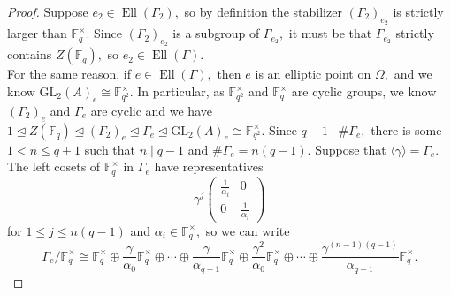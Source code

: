 \documentclass[11pt]{amsart}
\theoremstyle{definition}
\numberwithin{equation}{section}
\newcommand{\GL}{\mathrm{GL}} 	%
\newcommand{\bbF}{\mathbb{F}}		%
\begin{document}
		\begin{proof}
			Suppose $e_2\in \operatorname{Ell}(\Gamma_2),$ so by definition the stabilizer $(\Gamma_2)_{e_2}$ is strictly larger than $\bbF_q^{\times}.$ Since $(\Gamma_2)_{e_2}$ is a subgroup of $\Gamma_{e_2},$ it must be that $\Gamma_{e_2}$ strictly contains $Z(\bbF_q),$ so $e_2\in \operatorname{Ell}(\Gamma).$\\
			
			For the same reason, if $e\in \operatorname{Ell}(\Gamma),$ then $e$ is an elliptic point on $\Omega,$ and we know $\GL_2(A)_e\cong \bbF_{q^2}^{\times}.$  In particular, as $\bbF_{q^2}^{\times}$ and $\bbF_q^{\times}$ are cyclic groups, we know $(\Gamma_2)_e$ and $\Gamma_e$ are cyclic and we have $1\unlhd Z(\bbF_q)\unlhd (\Gamma_2)_e\unlhd \Gamma_e\unlhd \GL_2(A)_e\cong \bbF_{q^2}^{\times}.$ 
			Since $q-1\mid \#\Gamma_e,$ there is some $1<n\leq q+1$ such that $n\mid q-1$ and $\#\Gamma_e=n(q-1).$ 
			Suppose that $\langle \gamma \rangle =\Gamma_e.$ The left cosets of $\bbF_q^{\times}$ in $\Gamma_e$ have representatives 
			\[\gamma^j\left(\begin{array}{cc}\frac{1}{\alpha_i}&0\\0&\frac{1}{\alpha_i}\end{array}\right)\]
			for $1\leq j \leq n(q-1)$ and $\alpha_i\in \bbF_q^{\times},$ so we can write 
			\[\Gamma_e/\bbF_q^{\times}\cong \bbF_q^{\times}\oplus \frac{\gamma}{\alpha_0}\bbF_q^{\times}\oplus\cdots\oplus \frac{\gamma}{\alpha_{q-1}}\bbF_q^{\times}\oplus \frac{\gamma^2}{\alpha_0}\bbF_q^{\times}\oplus\cdots\oplus \frac{\gamma^{(n-1)(q-1)}}{\alpha_{q-1}}\bbF_q^{\times}.\]
			

\end{proof}
\end{document}
